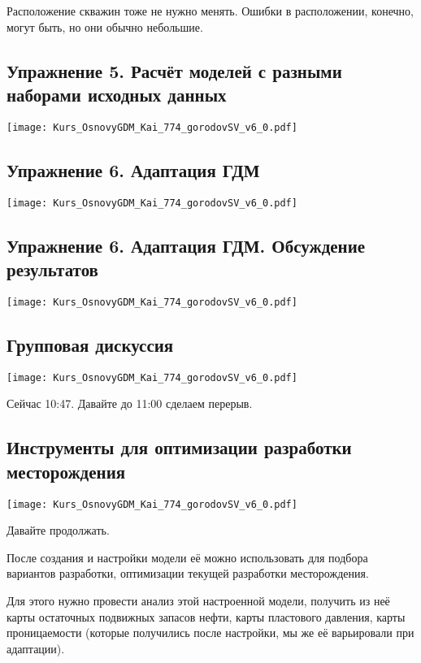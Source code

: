 \documentclass[main.tex]{subfiles}
\begin{document}
Расположение скважин тоже не нужно менять.
Ошибки в расположении, конечно, могут быть, но они обычно небольшие.

\subsection{Упражнение 5. Расчёт моделей с разными наборами исходных данных}

\texttt{[image: Kurs\_OsnovyGDM\_Kai\_774\_gorodovSV\_v6\_0.pdf]}

\subsection{Упражнение 6. Адаптация ГДМ}

\texttt{[image: Kurs\_OsnovyGDM\_Kai\_774\_gorodovSV\_v6\_0.pdf]}

\subsection{Упражнение 6. Адаптация ГДМ. Обсуждение результатов}

\texttt{[image: Kurs\_OsnovyGDM\_Kai\_774\_gorodovSV\_v6\_0.pdf]}

\subsection{Групповая дискуссия}

\texttt{[image: Kurs\_OsnovyGDM\_Kai\_774\_gorodovSV\_v6\_0.pdf]}

Сейчас 10:47. Давайте до 11:00 сделаем перерыв.

\subsection{Инструменты для оптимизации разработки месторождения}

\texttt{[image: Kurs\_OsnovyGDM\_Kai\_774\_gorodovSV\_v6\_0.pdf]}

Давайте продолжать.

После создания и настройки модели её можно использовать для подбора вариантов разработки, оптимизации текущей разработки месторождения.

Для этого нужно провести анализ этой настроенной модели, получить из неё карты остаточных подвижных запасов нефти, карты пластового давления, карты проницаемости (которые получились после настройки, мы же её варьировали при адаптации).\\
\end{document}
